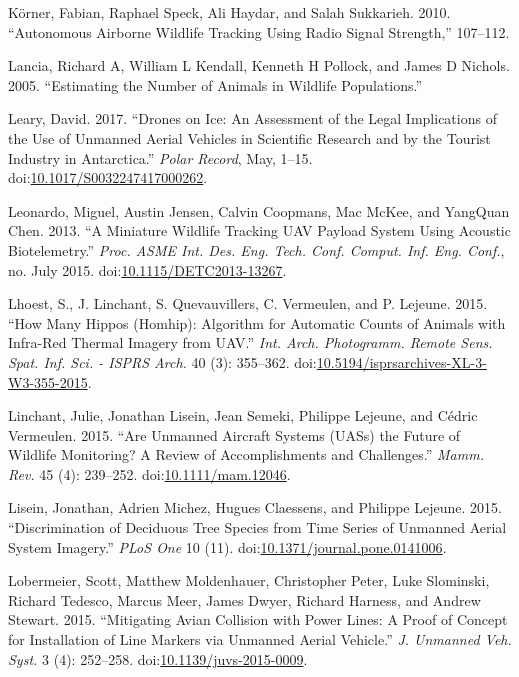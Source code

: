 \documentclass[]{interact}
\theoremstyle{plain}%
\theoremstyle{definition}
\theoremstyle{remark}
\begin{document}
\hypertarget{ref-korner_autonomous_2010}{}
Körner, Fabian, Raphael Speck, Ali Haydar, and Salah Sukkarieh. 2010.
``Autonomous Airborne Wildlife Tracking Using Radio Signal Strength,''
107--112.

\hypertarget{ref-lancia_estimating_2005}{}
Lancia, Richard A, William L Kendall, Kenneth H Pollock, and James D
Nichols. 2005. ``Estimating the Number of Animals in Wildlife
Populations.''

\hypertarget{ref-leary_drones_2017}{}
Leary, David. 2017. ``Drones on Ice: An Assessment of the Legal
Implications of the Use of Unmanned Aerial Vehicles in Scientific
Research and by the Tourist Industry in Antarctica.'' \emph{Polar
Record}, May, 1--15.
doi:\href{https://doi.org/10.1017/S0032247417000262}{10.1017/S0032247417000262}.

\hypertarget{ref-leonardo_miniature_2013}{}
Leonardo, Miguel, Austin Jensen, Calvin Coopmans, Mac McKee, and
YangQuan Chen. 2013. ``A Miniature Wildlife Tracking UAV Payload System
Using Acoustic Biotelemetry.'' \emph{Proc. ASME Int. Des. Eng. Tech.
Conf. Comput. Inf. Eng. Conf.}, no. July 2015.
doi:\href{https://doi.org/10.1115/DETC2013-13267}{10.1115/DETC2013-13267}.

\hypertarget{ref-lhoest_how_2015}{}
Lhoest, S., J. Linchant, S. Quevauvillers, C. Vermeulen, and P. Lejeune.
2015. ``How Many Hippos (Homhip): Algorithm for Automatic Counts of
Animals with Infra-Red Thermal Imagery from UAV.'' \emph{Int. Arch.
Photogramm. Remote Sens. Spat. Inf. Sci. - ISPRS Arch.} 40 (3):
355--362.
doi:\href{https://doi.org/10.5194/isprsarchives-XL-3-W3-355-2015}{10.5194/isprsarchives-XL-3-W3-355-2015}.

\hypertarget{ref-linchant_are_2015}{}
Linchant, Julie, Jonathan Lisein, Jean Semeki, Philippe Lejeune, and
Cédric Vermeulen. 2015. ``Are Unmanned Aircraft Systems (UASs) the
Future of Wildlife Monitoring? A Review of Accomplishments and
Challenges.'' \emph{Mamm. Rev.} 45 (4): 239--252.
doi:\href{https://doi.org/10.1111/mam.12046}{10.1111/mam.12046}.

\hypertarget{ref-lisein_discrimination_2015}{}
Lisein, Jonathan, Adrien Michez, Hugues Claessens, and Philippe Lejeune.
2015. ``Discrimination of Deciduous Tree Species from Time Series of
Unmanned Aerial System Imagery.'' \emph{PLoS One} 10 (11).
doi:\href{https://doi.org/10.1371/journal.pone.0141006}{10.1371/journal.pone.0141006}.

\hypertarget{ref-lobermeier_mitigating_2015}{}
Lobermeier, Scott, Matthew Moldenhauer, Christopher Peter, Luke
Slominski, Richard Tedesco, Marcus Meer, James Dwyer, Richard Harness,
and Andrew Stewart. 2015. ``Mitigating Avian Collision with Power Lines:
A Proof of Concept for Installation of Line Markers via Unmanned Aerial
Vehicle.'' \emph{J. Unmanned Veh. Syst.} 3 (4): 252--258.
doi:\href{https://doi.org/10.1139/juvs-2015-0009}{10.1139/juvs-2015-0009}.
\end{document}
